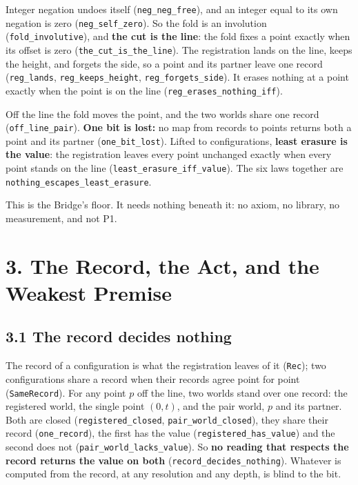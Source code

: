 \documentclass[10pt,twocolumn]{article}
\begin{document}
Integer negation undoes itself (\texttt{neg\_\allowbreak{}neg\_\allowbreak{}free}), and an integer
equal to its own negation is zero (\texttt{neg\_\allowbreak{}self\_\allowbreak{}zero}). So the
fold is an involution (\texttt{fold\_\allowbreak{}involutive}), and \textbf{the cut
is the line}: the fold fixes a point exactly when its offset is zero
(\texttt{the\_\allowbreak{}cut\_\allowbreak{}is\_\allowbreak{}the\_\allowbreak{}line}). The registration lands on the line,
keeps the height, and forgets the side, so a point and its partner leave
one record (\texttt{reg\_\allowbreak{}lands}, \texttt{reg\_\allowbreak{}keeps\_\allowbreak{}height},
\texttt{reg\_\allowbreak{}forgets\_\allowbreak{}side}). It erases nothing at a point exactly when
the point is on the line (\texttt{reg\_\allowbreak{}erases\_\allowbreak{}nothing\_\allowbreak{}iff}).

Off the line the fold moves the point, and the two worlds share one
record (\texttt{off\_\allowbreak{}line\_\allowbreak{}pair}). \textbf{One bit is lost:} no map from
records to points returns both a point and its partner
(\texttt{one\_\allowbreak{}bit\_\allowbreak{}lost}). Lifted to configurations, \textbf{least
erasure is the value}: the registration leaves every point unchanged
exactly when every point stands on the line
(\texttt{least\_\allowbreak{}erasure\_\allowbreak{}iff\_\allowbreak{}value}). The six laws together are
\texttt{nothing\_\allowbreak{}escapes\_\allowbreak{}least\_\allowbreak{}erasure}.

This is the Bridge's floor. It needs nothing beneath it: no axiom, no
library, no measurement, and not P1.

\hypertarget{the-record-the-act-and-the-weakest-premise}{%
\section{3. The Record, the Act, and the Weakest
Premise}\label{the-record-the-act-and-the-weakest-premise}}

\hypertarget{the-record-decides-nothing}{%
\subsection{3.1 The record decides
nothing}\label{the-record-decides-nothing}}

The record of a configuration is what the registration leaves of it
(\texttt{Rec}); two configurations share a record when their records
agree point for point (\texttt{SameRecord}). For any point \(p\) off the
line, two worlds stand over one record: the registered world, the single
point \((0,t)\), and the pair world, \(p\) and its partner. Both are
closed (\texttt{registered\_\allowbreak{}closed}, \texttt{pair\_\allowbreak{}world\_\allowbreak{}closed}), they
share their record (\texttt{one\_\allowbreak{}record}), the first has the value
(\texttt{registered\_\allowbreak{}has\_\allowbreak{}value}) and the second does not
(\texttt{pair\_\allowbreak{}world\_\allowbreak{}lacks\_\allowbreak{}value}). So \textbf{no reading that
respects the record returns the value on both}
(\texttt{record\_\allowbreak{}decides\_\allowbreak{}nothing}). Whatever is computed from the
record, at any resolution and any depth, is blind to the bit.
\end{document}
